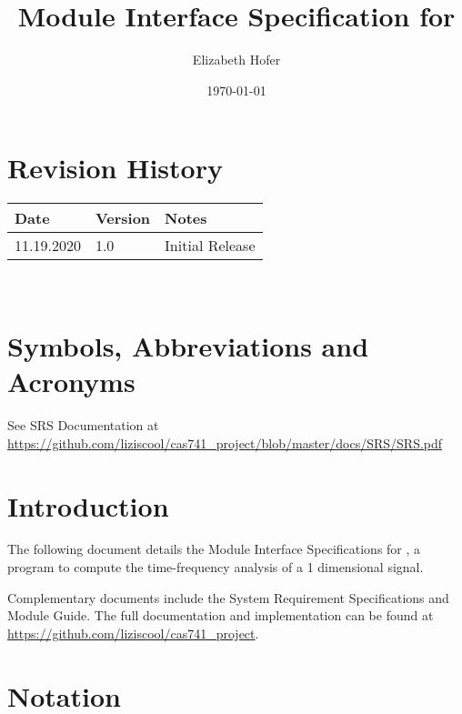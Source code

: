 \documentclass[12pt, titlepage]{article}
\begin{document}
\title{Module Interface Specification for \progname{}}

\author{Elizabeth Hofer}

\date{\today}

\maketitle


\section{Revision History}

\begin{tabularx}{\textwidth}{p{3cm}p{2cm}X}
\toprule {\bf Date} & {\bf Version} & {\bf Notes}\\
\midrule
11.19.2020 & 1.0 & Initial Release\\
\bottomrule
\end{tabularx}

~\newpage

\section{Symbols, Abbreviations and Acronyms}

See SRS Documentation at \url{https://github.com/liziscool/cas741_project/blob/master/docs/SRS/SRS.pdf}

\newpage

\tableofcontents

\newpage


\section{Introduction}

The following document details the Module Interface Specifications for
\progname{}, a program to compute the time-frequency analysis of a 1 dimensional signal.

Complementary documents include the System Requirement Specifications
and Module Guide.  The full documentation and implementation can be
found at \url{https://github.com/liziscool/cas741_project}.  

\section{Notation}
\end{document}
